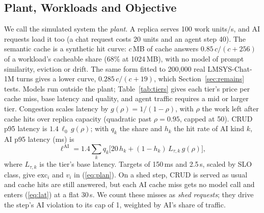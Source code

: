 \documentclass[conference,a4paper]{IEEEtran}
\begin{document}
\subsection{Plant, Workloads and Objective}
\label{sec:sim}

\begin{table}[!t]
\caption{Model Tiers of the Plant. Quality: Mean of 11 Benchmark Scores of
the Qwen2.5 Instruction-Tuned Models~\cite{qwen25}$/100$, Priced Only in
QUALITY (at Measured GPU Prices)}
\label{tab:tiers}
\centering
\scriptsize
\setlength{\tabcolsep}{3.4pt}

\end{table}

We call the simulated system the \emph{plant}. A replica serves 100 work
units/s, and AI requests load it too (a chat request costs 20 units and an
agent step 40). The semantic cache is a synthetic hit curve: $c$\,MB of
cache answers $0.85\,c/(c+256)$ of a workload's cacheable share (68\% at
1024\,MB), with no model of prompt similarity, eviction or drift. The same
form fitted to 200{,}000 real LMSYS-Chat-1M turns gives a lower curve,
$0.285\,c/(c+19)$, which Section~\ref{sec:remains} tests. Models run outside
the plant; Table~\ref{tab:tiers} gives each tier's price per cache miss, base
latency and quality, and agent traffic requires a mid or larger tier.
Congestion scales latency by $g(\rho)=1/(1-\rho)$, with
$\rho$ the work left after cache hits over replica capacity (quadratic past
$\rho=0.95$, capped at 50). CRUD p95 latency is $1.4\,\ell_0\,g(\rho)$; with
$q_k$ the share and $h_k$ the hit rate of AI kind $k$, AI p95 latency (ms) is
\begin{equation}
\label{eq:lat}
\ell^{\mathrm{AI}}=1.4\sum_k q_k\bigl[20\,h_k+(1-h_k)\,L_{\tau,k}\,g(\rho)\bigr],
\end{equation}
where $L_{\tau,k}$ is the tier's base latency. Targets of 150\,ms and
2.5\,s, scaled by SLO class, give $\mathrm{exc}_i$ and $v_i$ in
(\ref{eq:plan}). On a shed step, CRUD is served as usual and cache hits are
still answered, but each AI cache miss gets no model call and enters
(\ref{eq:lat}) at a flat 30\,s. We count these misses as \emph{shed
requests}; they drive the step's AI violation to its cap of 1, weighted by
AI's share of traffic.
\end{document}
